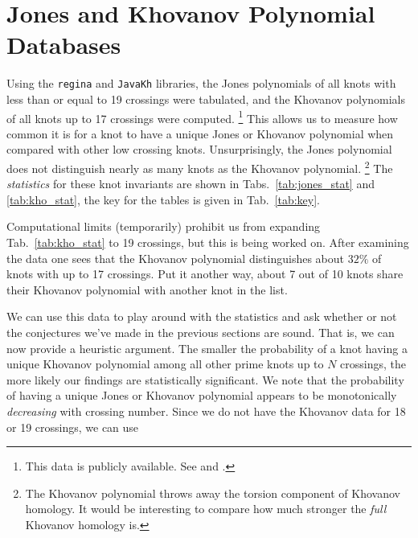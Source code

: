 \documentclass{article}
\theoremstyle{plain}
\begin{document}
    \section{Jones and Khovanov Polynomial Databases}
        Using the \texttt{regina} and \texttt{JavaKh} libraries, the Jones
        polynomials of all knots with less than or equal to 19 crossings were
        tabulated, and the Khovanov polynomials of all knots up to 17 crossings
        were computed.%
        \footnote{%
            This data is publicly available. See
            \cite{JonesData} and \cite{KhovanovData}.
        }
        This allows us to measure how common it is for a knot
        to have a unique Jones or Khovanov polynomial when compared with other
        low crossing knots. Unsurprisingly, the Jones polynomial does not
        distinguish nearly as many knots as the Khovanov polynomial.%
        \footnote{%
            The Khovanov polynomial throws away the torsion component of
            Khovanov homology. It would be interesting to compare how much
            stronger the \textit{full} Khovanov homology is.
        }
        The \textit{statistics} for these knot invariants are shown in
        Tabs.~\ref{tab:jones_stat} and \ref{tab:kho_stat}, the key for the
        tables is given in Tab.~\ref{tab:key}.
        \par\hfill\par
        Computational limits (temporarily) prohibit us from expanding
        Tab.~\ref{tab:kho_stat} to 19 crossings, but this is being worked on.
        After examining the data one sees that the Khovanov polynomial
        distinguishes about $32\%$ of knots with up to 17 crossings. Put it
        another way, about 7 out of 10 knots share their Khovanov polynomial
        with another knot in the list.
        \par\hfill\par
        We can use this data to play around with the statistics and ask whether or
        not the conjectures we've made in the previous sections are sound. That is,
        we can now provide a heuristic argument.
        The smaller the probability of a knot having a unique Khovanov
        polynomial among all other prime knots up to $N$ crossings, the
        more likely our findings are statistically significant. We note that
        the probability of having a unique Jones or Khovanov polynomial appears
        to be monotonically \textit{decreasing} with crossing number. Since
        we do not have the Khovanov data for 18 or 19 crossings, we can use
\end{document}
